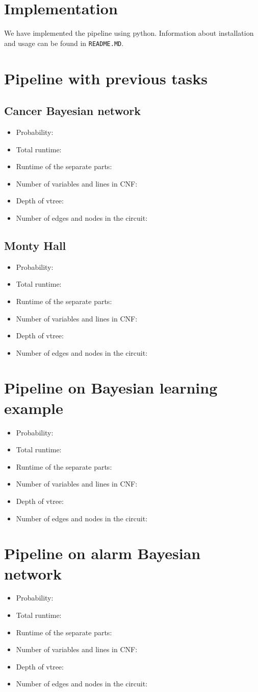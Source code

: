 \section{Implementation}
We have implemented the pipeline using python. Information about installation and usage can be found in \texttt{README.MD}.

\section{Pipeline with previous tasks}
\subsection{Cancer Bayesian network}
\begin{itemize}
    \item Probability:
    \item Total runtime:
    \item Runtime of the separate parts:
    \item Number of variables and lines in CNF:
    \item Depth of vtree:
    \item Number of edges and nodes in the circuit:
\end{itemize}
\subsection{Monty Hall}
\begin{itemize}
    \item Probability:
    \item Total runtime:
    \item Runtime of the separate parts:
    \item Number of variables and lines in CNF:
    \item Depth of vtree:
    \item Number of edges and nodes in the circuit:
\end{itemize}

\section{Pipeline on Bayesian learning example}
\begin{itemize}
    \item Probability:
    \item Total runtime:
    \item Runtime of the separate parts:
    \item Number of variables and lines in CNF:
    \item Depth of vtree:
    \item Number of edges and nodes in the circuit:
\end{itemize}

\section{Pipeline on alarm Bayesian network}
\begin{itemize}
    \item Probability:
    \item Total runtime:
    \item Runtime of the separate parts:
    \item Number of variables and lines in CNF:
    \item Depth of vtree:
    \item Number of edges and nodes in the circuit:
\end{itemize}